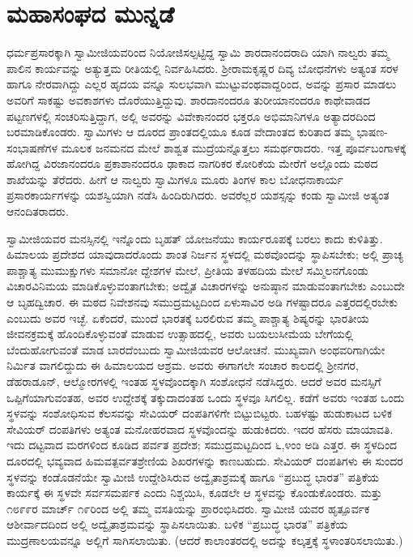 
\chapter{ಮಹಾಸಂಘದ ಮುನ್ನಡೆ}

\noindent

ಧರ್ಮಪ್ರಸಾರಕ್ಕಾಗಿ ಸ್ವಾಮೀಜಿಯವರಿಂದ ನಿಯೋಜಿಸಲ್ಪಟ್ಟಿದ್ದ ಸ್ವಾಮಿ ಶಾರದಾನಂದರಾದಿ ಯಾಗಿ ನಾಲ್ವರು ತಮ್ಮ ಪಾಲಿನ ಕಾರ್ಯವನ್ನು ಅತ್ಯುತ್ತಮ ರೀತಿಯಲ್ಲಿ ನಿರ್ವಹಿಸಿದರು. ಶ್ರೀರಾಮಕೃಷ್ಣರ ದಿವ್ಯ ಬೋಧನೆಗಳು ಅತ್ಯಂತ ಸರಳ ಹಾಗೂ ನೇರವಾಗಿದ್ದು ಎಲ್ಲರ ಹೃದಯ ವನ್ನೂ ಸುಲಭವಾಗಿ ಮುಟ್ಟುವಂಥವಾದ್ದರಿಂದ, ಅವನ್ನು ಪ್ರಸಾರ ಮಾಡಲು ಅವರಿಗೆ ಸಾಕಷ್ಟು ಅವಕಾಶಗಳು ದೊರೆಯುತ್ತಿದ್ದುವು. ಶಾರದಾನಂದರೂ ತುರೀಯಾನಂದರೂ ಕಾಥೇವಾಡದ ಪಟ್ಟಣಗಳಲ್ಲಿ ಸಂಚರಿಸುತ್ತಿದ್ದಾಗ, ಅಲ್ಲಿ ಅವರನ್ನು ವಿವೇಕಾನಂದರ ಭಕ್ತರೂ ಅಭಿಮಾನಿಗಳೂ ಅತ್ಯಾದರದಿಂದ ಬರಮಾಡಿಕೊಂಡರು. ಸ್ವಾಮಿಗಳು ಆ ದೂರದ ಪ್ರಾಂತದಲ್ಲಿಯೂ ಕೂಡ ವೇದಾಂತದ ಕುರಿತಾದ ತಮ್ಮ ಭಾಷಣ-ಸಂಭಾಷಣೆಗಳ ಮೂಲಕ ಜನಮನದ ಮೇಲೆ ಶಾಶ್ವತ ಮುದ್ರೆಯನ್ನೊತ್ತಲು ಸಮರ್ಥರಾದರು. ಇತ್ತ ಪೂರ್ವಬಂಗಾಳಕ್ಕೆ ಹೋಗಿದ್ದ ವಿರಜಾನಂದರೂ ಪ್ರಕಾಶಾನಂದರೂ ಢಾಕಾದ ನಾಗರಿಕರ ಕೋರಿಕೆಯ ಮೇರೆಗೆ ಅಲ್ಲೊಂದು ಮಠದ ಶಾಖೆಯನ್ನು ತೆರೆದರು. ಹೀಗೆ ಆ ನಾಲ್ವರು ಸ್ವಾಮಿಗಳೂ ಮೂರು ತಿಂಗಳ ಕಾಲ ಬೋಧನಾಕಾರ್ಯ ಪ್ರಸಾರಕಾರ್ಯಗಳನ್ನು ಯಶಸ್ವಿಯಾಗಿ ನಡೆಸಿ ಹಿಂದಿರುಗಿದರು. ಅವರೆಲ್ಲರ ಯಶಸ್ಸನ್ನು ಕಂಡು ಸ್ವಾಮೀಜಿ ಅತ್ಯಂತ ಆನಂದಿತರಾದರು.

ಸ್ವಾಮೀಜಿಯವರ ಮನಸ್ಸಿನಲ್ಲಿ ಇನ್ನೊಂದು ಬೃಹತ್ ಯೋಜನೆಯು ಕಾರ್ಯರೂಪಕ್ಕೆ ಬರಲು ಕಾದು ಕುಳಿತಿತ್ತು. ಹಿಮಾಲಯ ಪ್ರದೇಶದ ಯಾವುದಾದರೊಂದು ಶಾಂತ ನಿರ್ಜನ ಸ್ಥಳದಲ್ಲಿ ಮಠವೊಂದನ್ನು ಸ್ಥಾಪಿಸಬೇಕು; ಅಲ್ಲಿ ಪ್ರಾಚ್ಯ ಪಾಶ್ಚಾತ್ಯ ಮುಮುಕ್ಷುಗಳು ಸಮಾನೋ ದ್ದೇಶಗಳ ಮೇಲೆ, ಪ್ರೀತಿಯ ತಳಹದಿಯ ಮೇಲೆ ಸಮ್ಮಿಲನಗೊಂಡು ವಿಚಾರವಿನಿಮಯ ಮಾಡಿಕೊಳ್ಳುವಂತಾಗಬೇಕು; ಅದ್ವೈತ ವಿಚಾರಗಳನ್ನು ಅನುಷ್ಠಾನ ಮಾಡುವಂತಾಗಬೇಕು ಎಂಬುದೇ ಆ ಬೃಹದ್ವಿಚಾರ. ಈ ಮಠದ ನಿವೇಶನವು ಸಮುದ್ರಮಟ್ಟದಿಂದ ಏಳುಸಾವಿರ ಅಡಿ ಗಳಷ್ಟಾದರೂ ಎತ್ತರದಲ್ಲಿರಬೇಕು ಎಂಬುದು ಅವರ ಇಚ್ಛೆ. ಏಕೆಂದರೆ, ಮುಂದೆ ಭಾರತಕ್ಕೆ ಬರಲಿರುವ ತಮ್ಮ ಪಾಶ್ಚಾತ್ಯ ಶಿಷ್ಯರನ್ನು ಭಾರತೀಯ ಜೀವನಕ್ರಮಕ್ಕೆ ಹೊಂದಿಕೊಳ್ಳುವಂತೆ ಮಾಡುವ ಉತ್ಸಾಹದಲ್ಲಿ, ಅವರು ಬಯಲುಸೀಮೆಯ ಬೇಗೆಯಲ್ಲಿ ಬೆಂದುಹೋಗುವಂತೆ ಮಾಡ ಬಾರದೆಂಬುದು ಸ್ವಾಮೀಜಿಯವರ ಆಲೋಚನೆ. ಮುಖ್ಯವಾಗಿ ಅಂಥವರಿಗಾಗಿಯೇ ನಿರ್ಮಿತ ವಾಗಲಿದ್ದುದು ಈ ಹಿಮಾಲಯದ ಆಶ್ರಮ. ಅವರು ಈಗಾಗಲೇ ಸಂಚಾರ ಕಾಲದಲ್ಲಿ ಶ್ರೀನಗರ, ಡೆಹರಾಡೂನ್, ಆಲ್ಮೋರಗಳಲ್ಲಿ ಇಂತಹ ಸ್ಥಳವೊಂದಕ್ಕಾಗಿ ಸಂಶೋಧನೆ ನಡೆಸಿದ್ದರು. ಆದರೆ ಅವರ ಮನಸ್ಸಿಗೆ ಒಪ್ಪಿಗೆಯಾಗುವಂತಹ, ಅವರ ಉದ್ದೇಶಕ್ಕೆ ತಕ್ಕುದಾದಂತಹ ಒಂದು ಸ್ಥಳವೂ ಸಿಗಲಿಲ್ಲ. ಕಡೆಗೆ ಅವರು ಇಂತಹ ಒಂದು ಸ್ಥಳವನ್ನು ಸಂಶೋಧಿಸುವ ಕೆಲಸವನ್ನು ಸೇವಿಯರ್ ದಂಪತಿಗಳಿಗೇ ಬಿಟ್ಟುಬಿಟ್ಟರು. ಬಹಳಷ್ಟು ಹುಡುಕಾಟದ ಬಳಿಕ ಸೇವಿಯರ್ ದಂಪತಿಗಳು ಅತ್ಯಂತ ಮನೋಹರವಾದ ಸ್ಥಳವೊಂದನ್ನು ಹುಡುಕಿದರು. ಇದರ ಹೆಸರು ಮಾಯಾವತಿ. ಇದು ದಟ್ಟವಾದ ಮರಗಳಿಂದ ಕೂಡಿದ ಪರ್ವತ ಪ್ರದೇಶ; ಸಮುದ್ರಮಟ್ಟದಿಂದ ೬,೪ಂಂ ಅಡಿ ಎತ್ತರ. ಈ ಸ್ಥಳದಿಂದ ದೂರದಲ್ಲಿ ಭವ್ಯವಾದ ಹಿಮವತ್ಪರ್ವತಶ್ರೇಣಿಯ ಶಿಖರಗಳನ್ನು ಕಾಣಬಹುದು. ಸೇವಿಯರ್ ದಂಪತಿಗಳು ಈ ಸುಂದರ ಸ್ಥಳವನ್ನು ಕಂಡೊಡನೆಯೇ ಸ್ವಾಮೀಜಿ ಉದ್ದೇಶಿಸಿರುವ ಅದ್ವೈತಾಶ್ರಮಕ್ಕೆ ಹಾಗೂ “ಪ್ರಬುದ್ಧ ಭಾರತ” ಪತ್ರಿಕೆಯ ಕಾರ್ಯಕ್ಕೆ ಈ ಸ್ಥಳವೇ ಸರ್ವಸಮರ್ಪಕ ಎಂದು ನಿಶ್ಚಯಿಸಿ, ಕೂಡಲೇ ಆ ಸ್ಥಳವನ್ನು ಕೊಂಡುಕೊಂಡರು. ಮತ್ತು ೧೮೯೯ರ ಮಾರ್ಚ್ ೧೯ರಿಂದ ಅಲ್ಲಿ ತಮ್ಮ ವಸತಿಯನ್ನು ಪ್ರಾರಂಭಿಸಿದರು. ಸ್ವಾಮೀಜಿ ಯವರ ಹೃತ್ಪೂರ್ವಕ ಆಶೀರ್ವಾದದಿಂದ ಅಲ್ಲಿ ಅದ್ವೈತಾಶ್ರಮವನ್ನು ಸ್ಥಾಪಿಸಲಾಯಿತು. ಬಳಿಕ “ಪ್ರಬುದ್ಧ ಭಾರತ” ಪತ್ರಿಕೆಯ ಮುದ್ರಣಾಲಯವನ್ನೂ ಅಲ್ಲಿಗೆ ಸಾಗಿಸಲಾಯಿತು. (ಆದರೆ ಕಾಲಾಂತರದಲ್ಲಿ ಅದನ್ನು ಕಲ್ಕತ್ತಕ್ಕೆ ಸ್ಥಳಾಂತರಿಸಲಾಯಿತು.)


